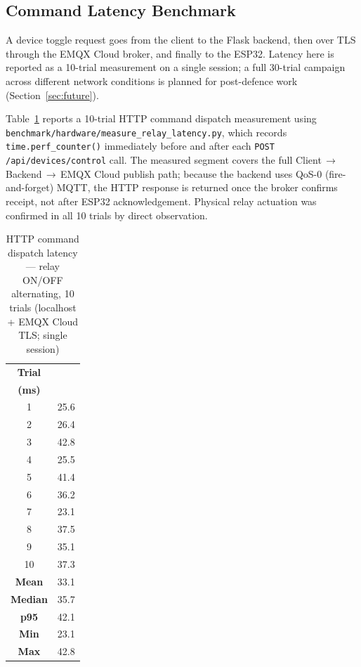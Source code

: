 \subsection{Command Latency Benchmark}
\label{subsec:latency_protocol}

A device toggle request goes from the client to the Flask backend, then over TLS through the EMQX Cloud broker, and finally to the ESP32. Latency here is reported as a 10-trial measurement on a single session; a full 30-trial campaign across different network conditions is planned for post-defence work (Section~\ref{sec:future}).

Table~\ref{tab:latency_record} reports a 10-trial HTTP command dispatch
measurement using \texttt{benchmark/hardware/measure\_relay\_latency.py}, which records
\texttt{time.perf\_counter()} immediately before and after each
\texttt{POST /api/devices/control} call. The measured segment covers the
full Client\,$\to$\,Backend\,$\to$\,EMQX Cloud publish path; because the
backend uses QoS-0 (fire-and-forget) MQTT, the HTTP response is returned
once the broker confirms receipt, not after ESP32 acknowledgement. Physical
relay actuation was confirmed in all 10 trials by direct observation.

\begin{table}[H]
\centering
\caption[HTTP command dispatch latency --- 10 trials]{HTTP command dispatch latency --- relay ON/OFF alternating, 10 trials
         (localhost + EMQX Cloud TLS; single session)}
\label{tab:latency_record}
\footnotesize
\setlength{\tabcolsep}{6pt}
\begin{tabular}{c r}
\toprule
\textbf{Trial} &
\makecell{\textbf{HTTP dispatch}\\\textbf{(ms)}} \\
\midrule
 1  & 25.6 \\
 2  & 26.4 \\
 3  & 42.8 \\
 4  & 25.5 \\
 5  & 41.4 \\
 6  & 36.2 \\
 7  & 23.1 \\
 8  & 37.5 \\
 9  & 35.1 \\
10  & 37.3 \\
\midrule
\textbf{Mean}   & 33.1 \\
\textbf{Median} & 35.7 \\
\textbf{p95}    & 42.1 \\
\textbf{Min}    & 23.1 \\
\textbf{Max}    & 42.8 \\
\bottomrule
\end{tabular}
\end{table}

